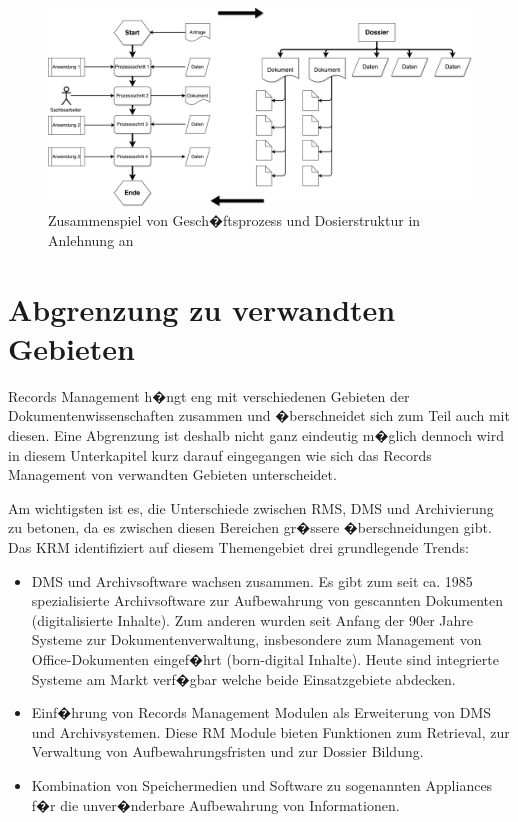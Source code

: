 \documentclass[a4paper,twoside,10pt]{report}
\begin{document}
\begin{figure}%
\includegraphics[width=1\textwidth]{RM_und_prozess.pdf}%
\caption{Zusammenspiel von Gesch�ftsprozess und Dosierstruktur in Anlehnung an \cite{rmHandbook}}%
\label{img:RM_und_prozess}%
\end{figure}

\section{Abgrenzung zu verwandten Gebieten}\label{rmNot}
Records Management h�ngt eng mit verschiedenen Gebieten der Dokumentenwissenschaften zusammen und �berschneidet sich zum Teil auch mit diesen. Eine Abgrenzung ist deshalb nicht ganz eindeutig m�glich dennoch wird in diesem Unterkapitel kurz darauf eingegangen wie sich das Records Management von verwandten Gebieten unterscheidet. 

Am wichtigsten ist es, die Unterschiede zwischen \ac{RMS}, \ac{DMS} und Archivierung zu betonen, da es zwischen diesen Bereichen gr�ssere �berschneidungen gibt. Das \ac{KRM} identifiziert auf diesem Themengebiet drei grundlegende Trends:
\begin{itemize}
	\item \ac{DMS} und Archivsoftware wachsen zusammen. Es gibt zum seit ca. 1985 spezialisierte Archivsoftware zur Aufbewahrung von gescannten Dokumenten (digitalisierte Inhalte). Zum anderen wurden seit Anfang der 90er Jahre Systeme zur Dokumentenverwaltung, insbesondere zum Management von Office-Dokumenten eingef�hrt (born-digital Inhalte). Heute sind integrierte Systeme am Markt verf�gbar welche beide Einsatzgebiete abdecken.
	\item Einf�hrung von Records Management Modulen als Erweiterung von \ac{DMS} und Archivsystemen. Diese \ac{RM} Module bieten Funktionen zum Retrieval, zur Verwaltung von Aufbewahrungsfristen und zur Dossier Bildung.
	\item Kombination von Speichermedien und Software zu sogenannten Appliances f�r die unver�nderbare Aufbewahrung von Informationen.
\end{itemize}
\end{document}
